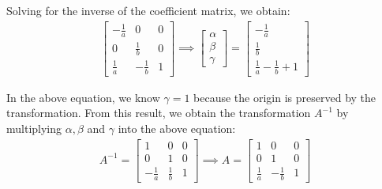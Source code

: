 \documentclass[12pt, oneside]{article}
\begin{document}
Solving for the inverse of the coefficient matrix, we obtain:
\begin{align*}
\begin{bmatrix}
-\frac{1}{a} & 0 & 0	\\
0 & \frac{1}{b} & 0		\\
\frac{1}{a}  & -\frac{1}{b}  & 1	
\end{bmatrix} \implies 
\begin{bmatrix}
\alpha \\
\beta \\
\gamma
\end{bmatrix} = 
\begin{bmatrix}
-\frac{1}{a} \\
\frac{1}{b} \\
\frac{1}{a} - \frac{1}{b} + 1
\end{bmatrix} 
\end{align*}

In the above equation, we know $\gamma = 1$ because the origin is preserved by the transformation. From this result, we obtain the transformation $A^{-1}$ by multiplying $\alpha, \beta$ and $\gamma$ into the above equation:
\begin{align*}
A^{-1} =
\begin{bmatrix}
1 & 0 & 0	\\
0 & 1 & 0		\\
-\frac{1}{a}  & \frac{1}{b}  & 1
\end{bmatrix} \implies 
A = \begin{bmatrix}
1 & 0 & 0	\\
0 & 1 & 0		\\
\frac{1}{a}  & -\frac{1}{b}  & 1
\end{bmatrix}
\end{align*}
\end{document}
